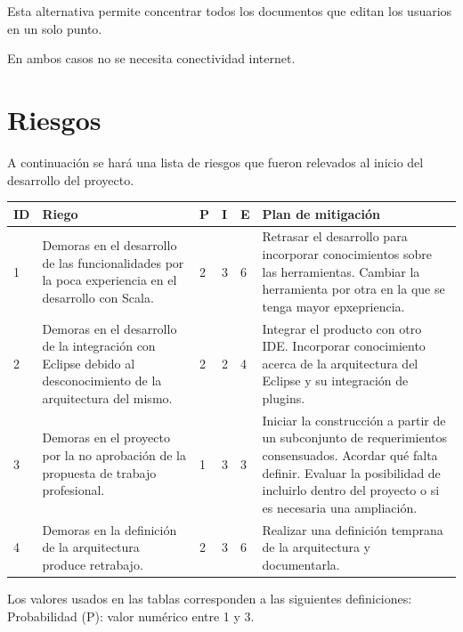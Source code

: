 \documentclass[12pt,a4paper]{article}
\begin{document}
Esta alternativa permite concentrar todos los documentos que editan los usuarios en un solo punto.

En ambos casos no se necesita conectividad internet.	
	
	\section{Riesgos}

A continuación se hará una lista de riesgos que fueron relevados al inicio del desarrollo del proyecto.

\begin{center}
    \begin{tabular}{ | l | p{5cm} | l | l | l | p{5cm} |}
    \hline
    ID & Riego & P & I & E & Plan de mitigación \\ \hline

	1 & Demoras en el desarrollo de las funcionalidades por la poca experiencia en el desarrollo con Scala.
	& 2 & 3 & 6 &
	Retrasar el desarrollo para incorporar conocimientos sobre las herramientas.
	Cambiar la herramienta por otra en la que se tenga mayor epxepriencia. \\ \hline

	2 & Demoras en el desarrollo de la integración con Eclipse debido al desconocimiento de la arquitectura del mismo.
	& 2 & 2 & 4 &
	Integrar el producto con otro IDE. Incorporar conocimiento acerca de la arquitectura del Eclipse y su integración de plugins. \\ \hline

	3 & Demoras en el proyecto por la no aprobación de la propuesta de trabajo profesional.
	& 1 & 3 & 3 &
	Iniciar la construcción a partir de un subconjunto de requerimientos consensuados. Acordar qué falta definir. Evaluar la posibilidad de incluirlo dentro del proyecto o si es necesaria una ampliación. \\ \hline

	4 & Demoras en la definición de la arquitectura produce retrabajo.
	& 2 & 3 & 6 &
	Realizar una definición temprana de la arquitectura y documentarla. \\ \hline
    \end{tabular}
\end{center}

Los valores usados en las tablas corresponden a las siguientes definiciones: \\

Probabilidad (P): valor numérico entre 1 y 3.
\end{document}
